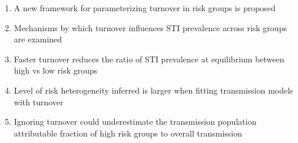 \begin{enumerate}	%
  \item A new framework for parameterizing turnover in risk groups is proposed					%
  \item Mechanisms by which turnover influences STI prevalence across risk groups are examined
  \item Faster turnover reduces the ratio of STI prevalence at equilibrium between high vs low risk groups
  \item Level of risk heterogeneity inferred is larger when fitting transmission models with turnover
  \item Ignoring turnover could underestimate the transmission population attributable fraction of high risk groups to overall transmission	%
  \end{enumerate}